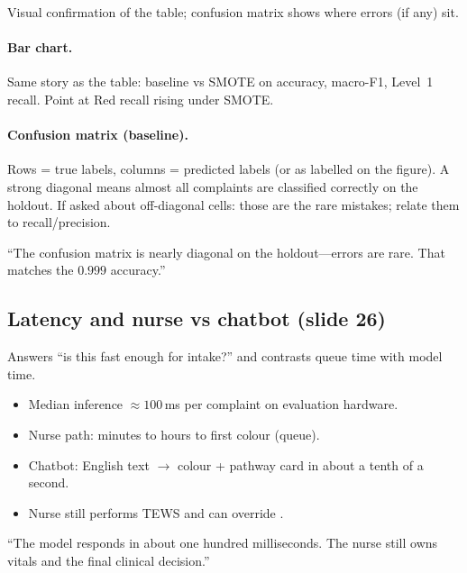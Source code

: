 \begin{whybox}
Visual confirmation of the table; confusion matrix shows where errors (if any) sit.
\end{whybox}

\paragraph{Bar chart.}
Same story as the table: baseline vs SMOTE on accuracy, macro-F1, Level~1 recall.
Point at Red recall rising under SMOTE.

\paragraph{Confusion matrix (baseline).}
Rows = true labels, columns = predicted labels (or as labelled on the figure).
A strong diagonal means almost all complaints are classified correctly on the holdout.
If asked about off-diagonal cells: those are the rare mistakes; relate them to recall/precision.

\begin{saybox}
``The confusion matrix is nearly diagonal on the holdout---errors are rare. That matches the \(0.999\) accuracy.''
\end{saybox}

\subsection{Latency and nurse vs chatbot (slide 26)}

\begin{whybox}
Answers ``is this fast enough for intake?'' and contrasts queue time with model time.
\end{whybox}

\begin{itemize}
  \item Median inference \(\approx 100\)\,ms per complaint on evaluation hardware.
  \item Nurse path: minutes to hours to first colour (queue).
  \item Chatbot: English text \(\to\) colour + pathway card in about a tenth of a second.
  \item Nurse still performs TEWS and can override \citep{Mitchell2023}.
\end{itemize}

\begin{saybox}
``The model responds in about one hundred milliseconds. The nurse still owns vitals and the final clinical decision.''
\end{saybox}

